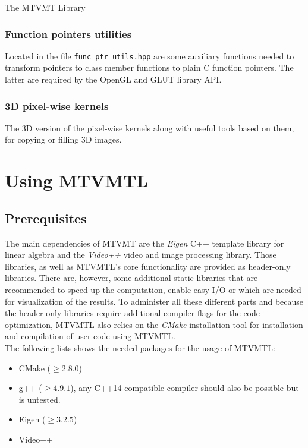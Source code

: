 \begin{chapter}{The MTVMT Library}

\subsubsection{Function pointers utilities} %
\label{ssub:Function pointers}
Located in the file \texttt{func\_ptr\_utils.hpp} are some auxiliary functions needed to transform pointers to class member functions
to plain C function pointers. The latter are required by the OpenGL and GLUT library API.

\subsubsection{3D pixel-wise kernels} %
\label{ssub:3D pixel-wise kernels}
The 3D version of the pixel-wise kernels along with useful tools based on them, for copying or filling 3D images.



\section{Using MTVMTL} %
\label{sec:Using TVTML}

\subsection{Prerequisites} %
\label{sub:Prerequisites}
The main dependencies of MTVMT are the \textit{Eigen} C++ template library for linear algebra and the \textit{Video++} video and image processing library. 
Those libraries, as well as MTVMTL's core functionality are provided as header-only libraries. There are, however, some additional static libraries
that are recommended to speed up the computation, enable easy I/O or which are needed for visualization of the results.
To administer all these different parts and because the header-only libraries require additional compiler flags for the code optimization, MTVMTL also relies
on the \textit{CMake} installation tool for installation and compilation of user code using MTVMTL. \\

The following lists shows the needed packages for the usage of MTVMTL:
\begin{itemize}
    \item CMake ($\geq 2.8.0$)
    \item g++ ($\geq 4.9.1$), any C++14 compatible compiler should also be possible but is untested.
    \item Eigen ($\geq 3.2.5$)
    \item Video++
\end{itemize}


\end{chapter}

